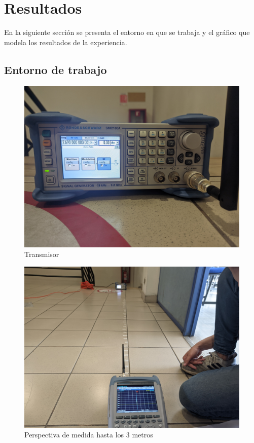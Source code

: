 \section{Resultados}\label{sec:resultados}
En la siguiente sección se presenta el entorno en que se trabaja y el gráfico que modela los resultados de la experiencia.

\subsection{Entorno de trabajo}

  \begin{figure}[H]
        \centering
        \includegraphics[width=\linewidth]{Imagenes/data/Transmisor.jpg}
        \caption{Transmisor}
        \label{transmisor}
  \end{figure}

  \begin{figure}[H]
        \centering
        \includegraphics[width=\linewidth]{Imagenes/data/Fin_3metros.jpg}
        \caption{Perspectiva de medida hasta los 3 metros}
        \label{3m}
  \end{figure}

